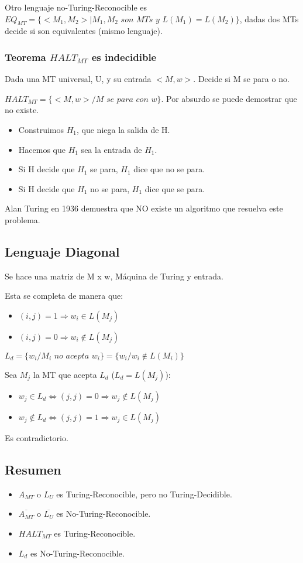 Otro lenguaje no-Turing-Reconocible es $EQ_{MT}=\{<M_1, M_2> | M_1, M_2 \textit{ son MTs y } L(M_1)=L(M_2)\}$, dadas dos MTs decide si son equivalentes (mismo lenguaje).

\subsubsection{Teorema $HALT_{MT}$ es indecidible}
Dada una MT universal, U, y su entrada $<M,w>$. Decide si M se para o no.

$HALT_{MT}=\{<M,w> / M \textit{ se para con w}\}$. Por absurdo se puede demostrar que no existe.
\begin{itemize}
	\item Construimos $H_1$, que niega la salida de H.
	\item Hacemos que $H_1$ sea la entrada de $H_1$.
	\item Si H decide que $H_1$ se para, $H_1$ dice que no se para.
	\item Si H decide que $H_1$ no se para, $H_1$ dice que se para.
\end{itemize}

Alan Turing en 1936 demuestra que NO existe un algoritmo que resuelva este problema.

\subsection{Lenguaje Diagonal}
Se hace una matriz de M x w, Máquina de Turing y entrada.

Esta se completa de manera que:
\begin{itemize}
	\item $(i, j)= 1 \Rightarrow w_i \in L(M_j)$
	\item $(i, j)= 0 \Rightarrow w_i \notin L(M_j)$
\end{itemize}

$L_d = \{ w_i / M_i \textit{ no acepta } w_i\}= \{w_i / w_i \notin L(M_i)\}$

Sea $M_j$ la MT que acepta $L_d$ ($L_d = L(M_j)$):
\begin{itemize}
	\item $w_j \in L_d \Leftrightarrow (j,j)=0 \Rightarrow w_j \notin L(M_j)$
	\item $w_j \notin L_d \Leftrightarrow (j,j)=1 \Rightarrow w_j \in L(M_j)$
\end{itemize}

Es contradictorio.

\subsection{Resumen}
\begin{itemize}
	\item $A_{MT}$ o $L_U$ es Turing-Reconocible, pero no Turing-Decidible.
	\item $\overline{A_{MT}}$ o $\overline{L_U}$ es No-Turing-Reconocible.
	\item $HALT_{MT}$ es Turing-Reconocible.
	\item $L_d$ es No-Turing-Reconocible.
\end{itemize}

